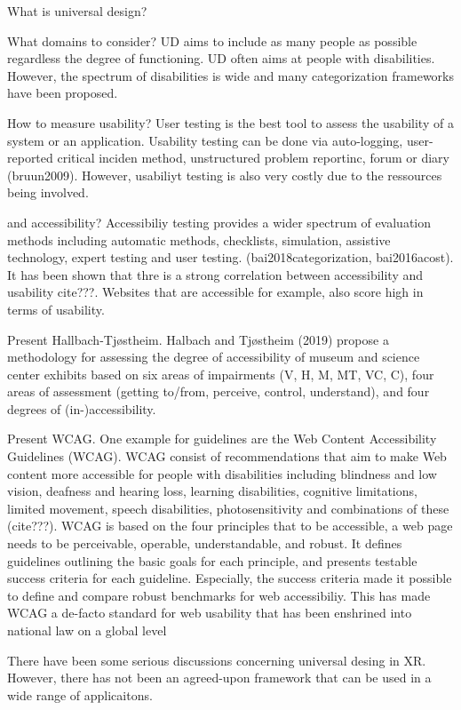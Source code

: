 \documentclass[11pt,english]{nik}
\begin{document}
What is universal design?

What domains to consider?
UD aims to include as many people as possible regardless the degree of functioning. UD often aims at people with disabilities. However, the spectrum of disabilities is wide and many categorization frameworks have been proposed.

How to measure usability?
User testing is the best tool to assess the usability of a system or an application. Usability testing can be done via auto-logging, user-reported critical inciden method, unstructured problem reportinc, forum or diary (bruun2009). However, usabiliyt testing is also very costly due to the ressources being involved.

and accessibility?
Accessibiliy testing provides a wider spectrum of evaluation methods including automatic methods, checklists, simulation, assistive technology, expert testing and user testing. (bai2018categorization, bai2016acost). It has been shown that thre is a strong correlation between accessibility and usability cite???. Websites that are accessible for example, also score high in terms of usability.

Present Hallbach-Tjøstheim.
Halbach and Tjøstheim (2019) propose a methodology for assessing the degree of accessibility of museum and science center exhibits based on six areas of impairments (V, H, M, MT, VC, C), four areas of assessment (getting to/from, perceive, control, understand), and four degrees of (in-)accessibility.


Present WCAG.
One example for guidelines are the Web Content Accessibility Guidelines (WCAG). WCAG consist of recommendations that aim to make Web content more accessible for people with disabilities including blindness and low vision, deafness and hearing loss, learning disabilities, cognitive limitations, limited movement, speech disabilities, photosensitivity and combinations of these (cite???). WCAG is based on the four principles that to be accessible, a web page needs to be perceivable, operable, understandable, and robust. It defines guidelines outlining the basic goals for each principle, and presents testable success criteria for each guideline. Especially, the success criteria made it possible to define and compare robust benchmarks for web accessibiliy. This has made WCAG a  de-facto standard for web usability that has been enshrined into national law on a global level

There have been some serious discussions concerning universal desing in XR. However, there has not been an agreed-upon framework that can be used in a wide range of applicaitons.
\end{document}
